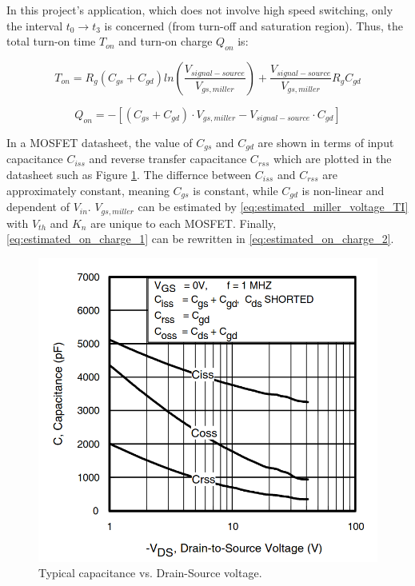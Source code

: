 \documentclass[main.tex]{subfiles}
\begin{document}
    \justify
    In this project's application, which does not involve high speed switching, only the interval $t_0 \rightarrow t_3$ is concerned (from turn-off and saturation region). Thus, the total turn-on time $T_{on}$ and turn-on charge $Q_{on}$ is:

    \begin{equation} 
        T_{on} = R_{g}(C_{gs} +C_{gd})ln\left(\dfrac{V_{signal-source}}{V_{gs, miller}}\right) + \dfrac{V_{signal-source}}{V_{gs,miller}}R_{g}C_{gd}
    \end{equation}

    \begin{equation} \label{eq:estimated_on_charge_1}
        Q_{on} = -[(C_{gs} +C_{gd})\cdot V_{gs, miller} - V_{signal-source}\cdot C_{gd}]
    \end{equation}

    \justify
    In a MOSFET datasheet, the value of $C_{gs}$ and $C_{gd}$ are shown in terms of input capacitance $C_{iss}$ and reverse transfer capacitance $C_{rss}$ which are plotted in the datasheet such as Figure \ref{fig:typical_capacitance_plot}. The differnce between $C_{iss}$ and $C_{rss}$ are approximately constant, meaning $C_{gs}$ is constant, while $C_{gd}$ is non-linear and dependent of $V_{in}$. $V_{gs,miller}$ can be estimated by \eqref{eq:estimated_miller_voltage_TI} with $V_{th}$ and $K_n$ are unique to each MOSFET. Finally, \eqref{eq:estimated_on_charge_1} can be rewritten in \eqref{eq:estimated_on_charge_2}.

    \begin{figure}[!h]
        \centerline{\includegraphics[scale=0.25]{media/typical_capacitance_plot.png}}
        \caption{Typical capacitance vs. Drain-Source voltage.}
        \label{fig:typical_capacitance_plot}
    \end{figure}
\end{document}
